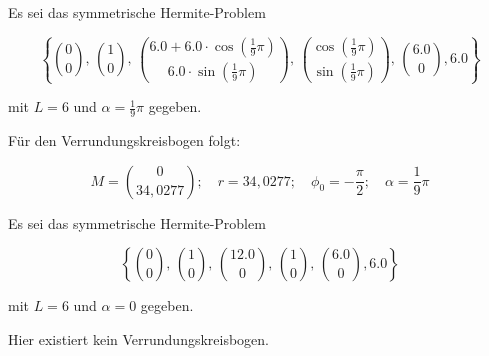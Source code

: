 \BEISPIEL
{
  Es sei das symmetrische Hermite-Problem 
  
  $$\left\{\binom{0}{0},\, \binom{1}{0},\,
  \binom{6.0+6.0\cdot \cos\left(\frac{1}{9}\pi\right)}{6.0\cdot \sin\left(\frac{1}{9}\pi\right)},\, \binom{\cos\left(\frac{1}{9}\pi\right)}{\sin\left(\frac{1}{9}\pi\right)},\, \binom{6.0}{0},6.0\right\}$$
  
  mit $L=6$ und $\alpha=\frac{1}{9}\pi$ gegeben.
  
  Für den Verrundungskreisbogen folgt:
  
  $$M=\binom{0}{34,0277}; \quad r=34,0277;\quad \phi_0 = -\frac{\pi}{2}; \quad \alpha=\frac{1}{9}\pi$$
  
  
  \begin{center}
  \end{center}
}


\BEISPIEL
{
  Es sei das symmetrische Hermite-Problem 
  
  $$\left\{\binom{0}{0},\, \binom{1}{0},\,
  \binom{12.0}{0},\, \binom{1}{0},\, \binom{6.0}{0},6.0\right\}$$
  
  mit $L=6$ und $\alpha=0$ gegeben.
  
 Hier existiert kein Verrundungskreisbogen.
  
  
  \begin{center}
  \end{center}
}



